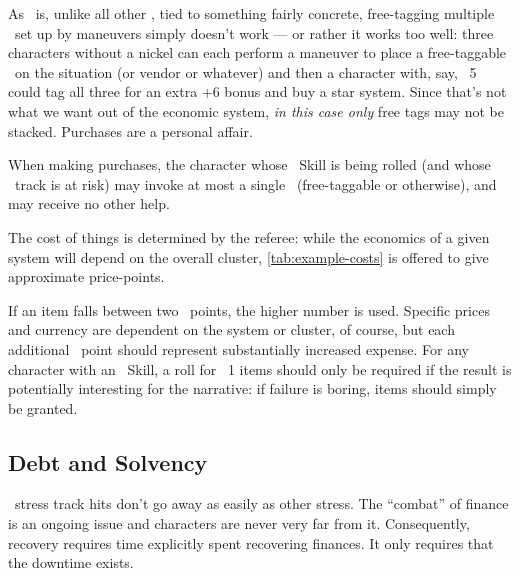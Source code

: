 As \Assets\ is, unlike all other \Skills, tied to something fairly concrete, free-tagging multiple \Aspects\ set up by maneuvers simply doesn't work --- or rather it works too well: three characters without a nickel can each perform a maneuver to place a free-taggable \Aspect\ on the situation (or vendor or whatever) and then a character with, say, \Assets\ 5 could tag all three for an extra +6 bonus and buy a star system. Since that's not what we want out of the economic system, \emph{in this case only} free tags may not be stacked. Purchases are a personal affair.



When making purchases, the character whose \Assets\ Skill is being rolled (and whose \Wealth\ track is at risk) may invoke at most a single \Aspect\ (free-taggable or otherwise), and may receive no other help.

The cost of things is determined by the referee: while the economics of a given system will depend on the overall cluster, \autoref{tab:example-costs} is offered to give approximate price-points.

If an item falls between two \Cost\ points, the higher number is used. Specific prices and currency are dependent on the system or cluster, of course, but each additional \Cost\ point should represent substantially increased expense. For any character with an \Assets\ Skill, a roll for \Cost\ 1 items should only be required if the result is potentially interesting for the narrative: if failure is boring, items should simply be granted.


\subsection{Debt and Solvency}
\label{sec:debt-and-solvency}

\Wealth\ stress track hits don't go away as easily as other stress. The ``combat'' of finance is an ongoing issue and characters are never very far from it. Consequently, recovery requires time explicitly spent recovering finances. It only requires that the downtime exists.

